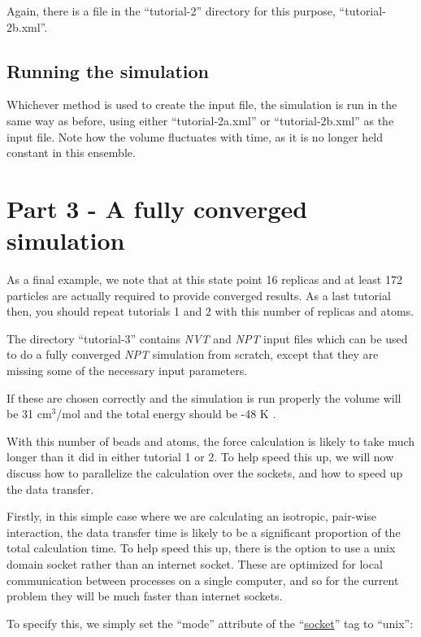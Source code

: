 \documentclass[11pt,english,fleqn]{report}
\begin{document}
Again, there is a file in the {}``tutorial-2'' directory
for this purpose, {}``tutorial-2b.xml''.

\subsection{Running the simulation}

Whichever method is used to create the input file, the simulation
is run in the same way as before, using either
{}``tutorial-2a.xml'' or {}``tutorial-2b.xml'' as the input file. 
Note how the volume fluctuates with time, as it is no longer held
constant in this ensemble.

\section{Part 3 - A fully converged simulation}

As a final example, we note that at this state point 16 replicas
and at least 172 particles are actually 
required to provide converged results.
As a last tutorial then, you should repeat tutorials 1 and 2 with
this number of replicas and atoms. 

The directory {}``tutorial-3'' contains 
\emph{NVT} and \emph{NPT} input files which can be used to do a fully converged
\emph{NPT} simulation from scratch, except that they are missing some
of the necessary input parameters.

If these are chosen correctly and the simulation is run properly
the volume will be 31 \(\textrm{cm}^3\)/mol and the total energy
should be -48 K \cite{mart+99jcp}.

With this number of beads and atoms, the force calculation is likely
to take much longer than it did in either tutorial 1 or 2.
To help speed this up, we will now discuss how to parallelize the
calculation over the sockets, and how to speed up the data transfer.

Firstly, in this simple case where we are calculating an isotropic,
pair-wise interaction, the data transfer time is likely to be a
significant proportion of the total calculation time. To help speed this
up, there is the option to use a unix domain socket rather than an
internet socket. These are optimized for local communication between 
processes on a single computer, and so for the current problem they will be much
faster than internet sockets.

To specify this, we simply set the {}``mode'' attribute of the
{}``\hyperref[SOCKET]{socket}'' tag to {}``unix'':
\end{document}
